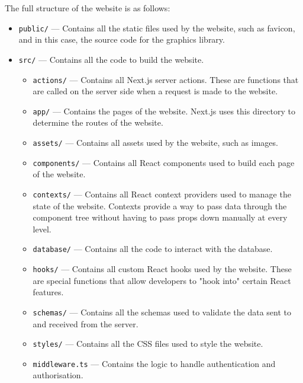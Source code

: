 \documentclass[../main.tex]{subfiles}
\begin{document}
            The full structure of the website is as follows:
            \begin{itemize}
                \item \texttt{public/} — Contains all the static files used by the website, such as
                      favicon, and in this case, the source code for the graphics library.
                \item \texttt{src/} — Contains all the code to build the website.
                      \begin{itemize}
                          \item \texttt{actions/} — Contains all Next.js server actions.
                                These are functions that are called on the server side when a request is made
                                    to the website.
                          \item \texttt{app/} — Contains the pages of the website.
                                Next.js uses this directory to determine the routes of the website.
                          \item \texttt{assets/} — Contains all assets used by the website, such as images.
                          \item \texttt{components/} — Contains all React components used to build each page of
                                the website.
                          \item \texttt{contexts/} — Contains all React context providers used to manage the state
                                of the website.
                                Contexts provide a way to pass data through the component tree without having
                                    to pass props down manually at every level.
                          \item \texttt{database/} — Contains all the code to interact with the database.
                          \item \texttt{hooks/} — Contains all custom React hooks used by the website.
                                These are special functions that allow developers to "hook into" certain React
                                    features.
                          \item \texttt{schemas/} — Contains all the schemas used to validate the data sent to and
                                received from the server.
                          \item \texttt{styles/} — Contains all the CSS files used to style the website.
                          \item \texttt{middleware.ts} — Contains the logic to handle authentication and
                                authorisation.
                      \end{itemize}
            \end{itemize}
\end{document}
